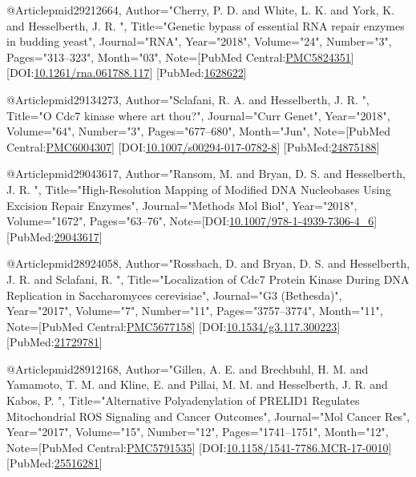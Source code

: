 @Article{pmid29212664,
   Author="Cherry, P. D.  and White, L. K.  and York, K.  and Hesselberth, J. R. ",
   Title="{{G}enetic bypass of essential {R}{N}{A} repair enzymes in budding yeast}",
   Journal="RNA",
   Year="2018",
   Volume="24",
   Number="3",
   Pages="313--323",
   Month="03",
   Note={[PubMed Central:\href{https://www.ncbi.nlm.nih.gov/pmc/articles/PMC5824351}{PMC5824351}] [DOI:\href{https://dx.doi.org/10.1261/rna.061788.117}{10.1261/rna.061788.117}] [PubMed:\href{https://www.ncbi.nlm.nih.gov/pubmed/1628622}{1628622}] }
}

@Article{pmid29134273,
   Author="Sclafani, R. A.  and Hesselberth, J. R. ",
   Title="{{O} {C}dc7 kinase where art thou?}",
   Journal="Curr Genet",
   Year="2018",
   Volume="64",
   Number="3",
   Pages="677--680",
   Month="Jun",
   Note={[PubMed Central:\href{https://www.ncbi.nlm.nih.gov/pmc/articles/PMC6004307}{PMC6004307}] [DOI:\href{https://dx.doi.org/10.1007/s00294-017-0782-8}{10.1007/s00294-017-0782-8}] [PubMed:\href{https://www.ncbi.nlm.nih.gov/pubmed/24875188}{24875188}] }
}

@Article{pmid29043617,
   Author="Ransom, M.  and Bryan, D. S.  and Hesselberth, J. R. ",
   Title="{{H}igh-{R}esolution {M}apping of {M}odified {D}{N}{A} {N}ucleobases {U}sing {E}xcision {R}epair {E}nzymes}",
   Journal="Methods Mol Biol",
   Year="2018",
   Volume="1672",
   Pages="63--76",
   Note={[DOI:\href{https://dx.doi.org/10.1007/978-1-4939-7306-4_6}{10.1007/978-1-4939-7306-4_6}] [PubMed:\href{https://www.ncbi.nlm.nih.gov/pubmed/29043617}{29043617}] }
}

@Article{pmid28924058,
   Author="Rossbach, D.  and Bryan, D. S.  and Hesselberth, J. R.  and Sclafani, R. ",
   Title="{{L}ocalization of {C}dc7 {P}rotein {K}inase {D}uring {D}{N}{A} {R}eplication in {S}accharomyces cerevisiae}",
   Journal="G3 (Bethesda)",
   Year="2017",
   Volume="7",
   Number="11",
   Pages="3757--3774",
   Month="11",
   Note={[PubMed Central:\href{https://www.ncbi.nlm.nih.gov/pmc/articles/PMC5677158}{PMC5677158}] [DOI:\href{https://dx.doi.org/10.1534/g3.117.300223}{10.1534/g3.117.300223}] [PubMed:\href{https://www.ncbi.nlm.nih.gov/pubmed/21729781}{21729781}] }
}

@Article{pmid28912168,
   Author="Gillen, A. E.  and Brechbuhl, H. M.  and Yamamoto, T. M.  and Kline, E.  and Pillai, M. M.  and Hesselberth, J. R.  and Kabos, P. ",
   Title="{{A}lternative {P}olyadenylation of {P}{R}{E}{L}{I}{D}1 {R}egulates {M}itochondrial {R}{O}{S} {S}ignaling and {C}ancer {O}utcomes}",
   Journal="Mol Cancer Res",
   Year="2017",
   Volume="15",
   Number="12",
   Pages="1741--1751",
   Month="12",
   Note={[PubMed Central:\href{https://www.ncbi.nlm.nih.gov/pmc/articles/PMC5791535}{PMC5791535}] [DOI:\href{https://dx.doi.org/10.1158/1541-7786.MCR-17-0010}{10.1158/1541-7786.MCR-17-0010}] [PubMed:\href{https://www.ncbi.nlm.nih.gov/pubmed/25516281}{25516281}] }
}

